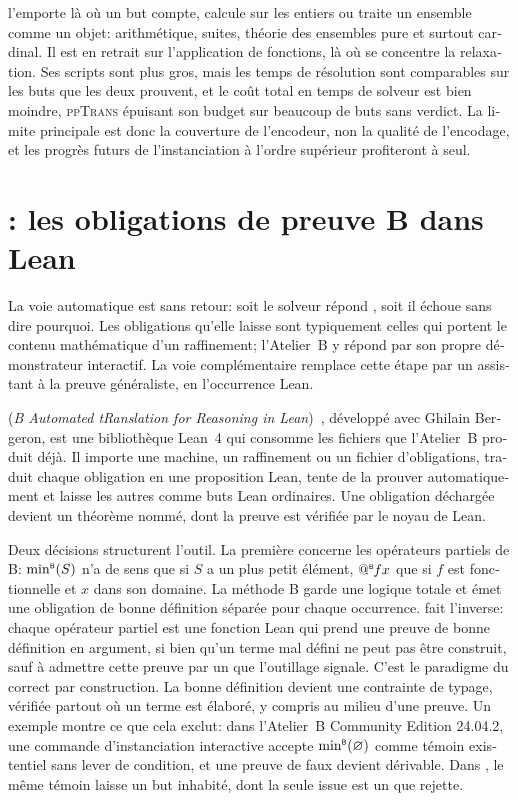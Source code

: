 \begin{otherlanguage}{french}
\beer{} l'emporte là où un but compte, calcule sur les entiers ou traite un
ensemble comme un objet: arithmétique, suites, théorie des ensembles pure et
surtout cardinal. Il est en retrait sur l'application de fonctions, là où se
concentre la relaxation. Ses scripts sont plus gros, mais les temps de
résolution sont comparables sur les buts que les deux prouvent, et le coût
total en temps de solveur est bien moindre, \textsc{ppTrans} épuisant son budget sur
beaucoup de buts sans verdict.
La limite principale est donc la couverture de l'encodeur, non la qualité
de l'encodage, et les progrès futurs de l'instanciation à l'ordre supérieur
profiteront à \beer{} seul.

\section*{\barrel{}: les obligations de preuve B dans Lean}

La voie automatique est sans retour: soit le solveur répond ,
soit il échoue sans dire pourquoi. Les obligations qu'elle laisse sont
typiquement celles qui portent le contenu mathématique d'un raffinement;
l'Atelier~B y répond par son propre démonstrateur interactif. La voie
complémentaire remplace cette étape par un assistant à la
preuve généraliste, en l'occurrence Lean.

\barrel{} (\emph{B Automated tRanslation for Reasoning in
Lean})~\cite{bergeron2026barrel,bergeron2026barrelAFADL}, développé avec
Ghilain Bergeron, est une
bibliothèque Lean~4 qui consomme les fichiers que l'Atelier~B produit déjà.
Il importe une machine, un raffinement ou un fichier d'obligations, traduit
chaque obligation en une proposition Lean, tente de la prouver
automatiquement et laisse les autres comme buts Lean ordinaires. Une
obligation déchargée devient un théorème nommé, dont la preuve est vérifiée
par le noyau de Lean.

Deux décisions structurent l'outil. La première concerne les opérateurs
partiels de B: \(\mathop{{\min}^{\scriptscriptstyle{\mathsf{B}}}}(S)\) n'a de sens que si \(S\) a un plus petit élément,
\(\mathord{@^{\scriptscriptstyle{\mathsf{B}}}\mkern-1mu} fx\) que si \(f\) est fonctionnelle et \(x\) dans son domaine. La
méthode B garde une logique totale et émet une obligation de bonne définition
séparée pour chaque occurrence. \barrel{} fait l'inverse: chaque opérateur
partiel est une fonction Lean qui prend une preuve de bonne définition en
argument, si bien qu'un terme mal défini ne peut pas être construit, sauf à
admettre cette preuve par un  que l'outillage signale. C'est le
paradigme du \og correct par construction\fg.
La bonne définition devient une contrainte de typage, vérifiée partout où un
terme est élaboré, y compris au milieu d'une preuve. Un exemple montre ce que
cela exclut: dans l'Atelier~B Community Edition 24.04.2, une commande
d'instanciation interactive accepte \(\mathop{{\min}^{\scriptscriptstyle{\mathsf{B}}}}(\varnothing)\) comme témoin
existentiel sans lever de condition, et une preuve de faux devient dérivable. Dans
\barrel{}, le même témoin laisse un but  inhabité, dont la
seule issue est un  que  rejette.


\end{otherlanguage}
